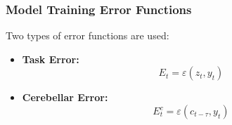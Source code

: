 \documentclass{beamer}
\begin{document}




    \begin{frame}
      \frametitle{Model Training Error Functions}
      \hspace{0.3cm} Two types of error functions are used:
      \vspace{0.5cm}
      \begin{itemize}
        \item \textbf{Task Error:}
          \begin{equation} E_t = \varepsilon(z_t, y_t) \end{equation}
      
      \vspace{0.3cm}

        \item \textbf{Cerebellar Error:}
          \begin{equation} E_t^c = \varepsilon(c_{t-\tau}, y_t) \end{equation}

      \end{itemize}
    \end{frame}
\end{document}

